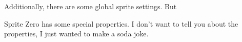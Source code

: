 \documentclass[twocolumn]{article}
\begin{document}
Additionally, there are some global sprite settings. But 

Sprite Zero has some special properties. I don't want to tell you
about the properties, I just wanted to make a soda joke.

\nocite{murphy2013first}



\end{document}
